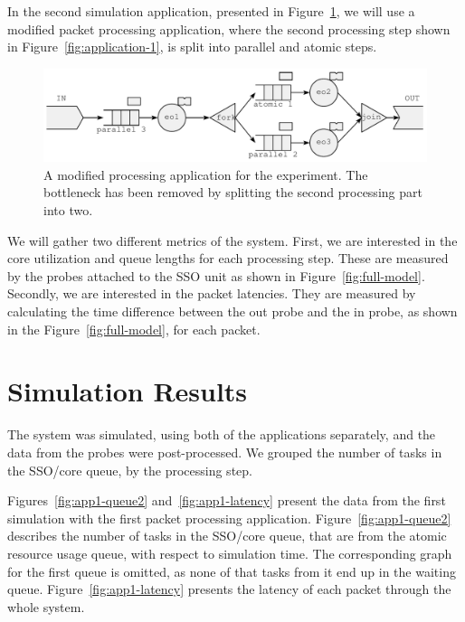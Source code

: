 In the second simulation application, presented in Figure~\ref{fig:application-2}, we will use a modified packet processing application, where the second processing step shown in Figure~\ref{fig:application-1}, is split into parallel and atomic steps.

\begin{figure}[]
  \begin{center}
    \includegraphics[width=\textwidth]{images/pse-models/application-2.pdf}
    \caption{A modified processing application for the experiment. The bottleneck has been removed by splitting the second processing part into two.}
    \label{fig:application-2}
  \end{center}
\end{figure}

We will gather two different metrics of the system. First, we are interested in the core utilization and queue lengths for each processing step. These are measured by the probes attached to the SSO unit as shown in Figure~\ref{fig:full-model}. Secondly, we are interested in the packet latencies. They are measured by calculating the time difference between the out probe and the in probe, as shown in the Figure~\ref{fig:full-model}, for each packet.

\section{Simulation Results}
\label{sec:simulation-results}

The system was simulated, using both of the applications separately, and the data from the probes were post-processed. We grouped the number of tasks in the SSO/core queue, by the processing step.

Figures~\ref{fig:app1-queue2} and~\ref{fig:app1-latency} present the data from the first simulation with the first packet processing application. Figure~\ref{fig:app1-queue2} describes the number of tasks in the SSO/core queue, that are from the atomic resource usage queue, with respect to simulation time. The corresponding graph for the first queue is omitted, as none of that tasks from it end up in the waiting queue. Figure~\ref{fig:app1-latency} presents the latency of each packet through the whole system.

